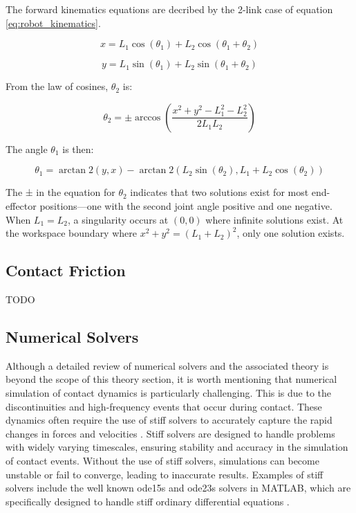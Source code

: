     The forward kinematics equations are decribed by the 2-link case of equation \ref{eq:robot_kinematics}.
    
    \begin{equation}
    x = L_1 \cos(\theta_1) + L_2 \cos(\theta_1 + \theta_2)
    \end{equation}
    
    \begin{equation}
    y = L_1 \sin(\theta_1) + L_2 \sin(\theta_1 + \theta_2)
    \end{equation}
    
    From the law of cosines, \(\theta_2\) is:
    
    \begin{equation}
    \theta_2 = \pm \arccos\left(\frac{x^2 + y^2 - L_1^2 - L_2^2}{2L_1L_2}\right)
    \end{equation}
    
    The angle \(\theta_1\) is then:
    
    \begin{equation}
    \theta_1 = \arctan2(y,x) - \arctan2(L_2\sin(\theta_2), L_1 + L_2\cos(\theta_2))
    \end{equation}
    
    The ± in the equation for \(\theta_2\) indicates that two solutions exist for most end-effector positions—one with the second joint angle positive and one negative. When \(L_1 = L_2\), a singularity occurs at \((0,0)\) where infinite solutions exist. At the workspace boundary where \(x^2 + y^2 = (L_1 + L_2)^2\), only one solution exists.


\subsection{Contact Friction}
\label{sec:contact_friction}
TODO

\subsection{Numerical Solvers}
\label{sec:numerical_solvers}

Although a detailed review of numerical solvers and the associated theory is beyond the scope of this theory section, it is worth mentioning that numerical simulation of contact dynamics is particularly challenging. This is due to the discontinuities and high-frequency events that occur during contact. These dynamics often require the use of stiff solvers to accurately capture the rapid changes in forces and velocities \cite{stiff_contact_ODE_1}\cite{stiff_contact_ODE_2}. Stiff solvers are designed to handle problems with widely varying timescales, ensuring stability and accuracy in the simulation of contact events. Without the use of stiff solvers, simulations can become unstable or fail to converge, leading to inaccurate results. Examples of stiff solvers include the well known ode15s and ode23s solvers in MATLAB, which are specifically designed to handle stiff ordinary differential equations \cite{MATLAB_ODE}. 


